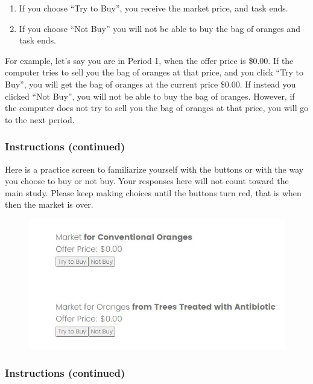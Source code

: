 \documentclass[12pt]{article}
\begin{document}
{\begin{enumerate}
    \item If you choose “Try to Buy”, you receive the market price, and task ends.
    \item If you choose “Not Buy” you will not be able to buy the bag of oranges and task ends.
\end{enumerate}


For example, let’s say you are in Period 1, when the offer price is \$0.00. If the computer tries to sell you the bag of oranges at that price, and you click “Try to Buy”, you will get the bag of oranges at the current price \$0.00. If instead you clicked “Not Buy”, you will not be able to buy the bag of oranges. However, if the computer does not try to sell you the bag of oranges at that price, you will go to the next period.

\clearpage



\subsubsection*{\textbf{Instructions (continued)}}


Here is a practice screen to familiarize yourself with the buttons or with the way you choose to buy or not buy. Your responses here will not count toward the main study.
Please keep making choices until the buttons turn red, that is when then the market is over.

\begin{figure}[H]
    \centering
    \includegraphics[width=0.8\linewidth]{GSO.JPG}
    
    \label{fig:GSO}
\end{figure}

\clearpage


\subsubsection*{\textbf{Instructions (continued)}}

}
\end{document}
